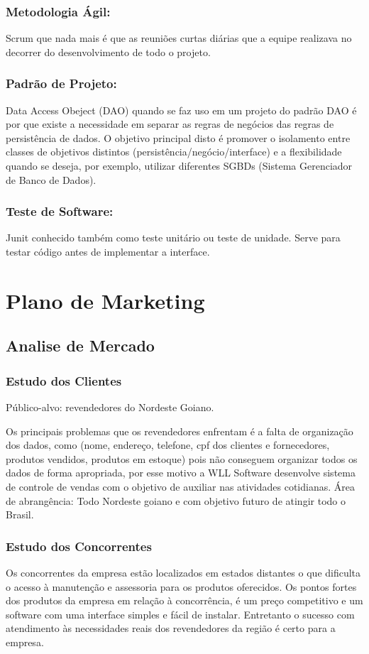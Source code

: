 \documentclass[chapter=TITLE,12pt,oneside,a4paper,english,french,sumario=tradicional,spanish,brazil,]{abntex2}
\begin{document}
\subsection{Metodologia Ágil:}
Scrum que nada mais é que as reuniões curtas diárias que a equipe realizava no decorrer do desenvolvimento de todo o projeto.

\subsection{Padrão de Projeto:}
Data Access Obeject (DAO) quando se faz uso em um projeto do padrão DAO é por que existe a necessidade em separar as regras de negócios das regras de persistência de dados. O objetivo principal disto é promover o isolamento entre classes de objetivos distintos (persistência/negócio/interface) e a flexibilidade quando se deseja, por exemplo, utilizar diferentes SGBDs (Sistema Gerenciador de Banco de Dados).

\subsection{Teste de Software:}
Junit conhecido também como teste unitário ou teste de unidade. Serve para testar código antes de implementar a interface.

\chapter{Plano de Marketing}
\section{Analise de Mercado}
\subsection{Estudo dos Clientes}
Público-alvo: revendedores do Nordeste Goiano.

Os principais problemas que os revendedores enfrentam é a falta de organização dos dados, como (nome, endereço, telefone, cpf dos clientes e fornecedores, produtos vendidos, produtos em estoque) pois não conseguem organizar todos os dados de forma apropriada, por esse motivo a WLL Software desenvolve sistema de controle de vendas com o objetivo de auxiliar nas atividades cotidianas.
Área de abrangência: Todo Nordeste goiano e com objetivo futuro de atingir todo o
Brasil.


\subsection{Estudo dos Concorrentes}
Os concorrentes da empresa estão localizados em estados distantes o que dificulta o acesso à manutenção e assessoria para os produtos oferecidos. Os pontos fortes dos produtos da empresa em relação à concorrência, é um preço competitivo e um software com uma interface simples e fácil de instalar. Entretanto o sucesso com atendimento às necessidades reais dos revendedores da região é certo para a empresa.
\end{document}
